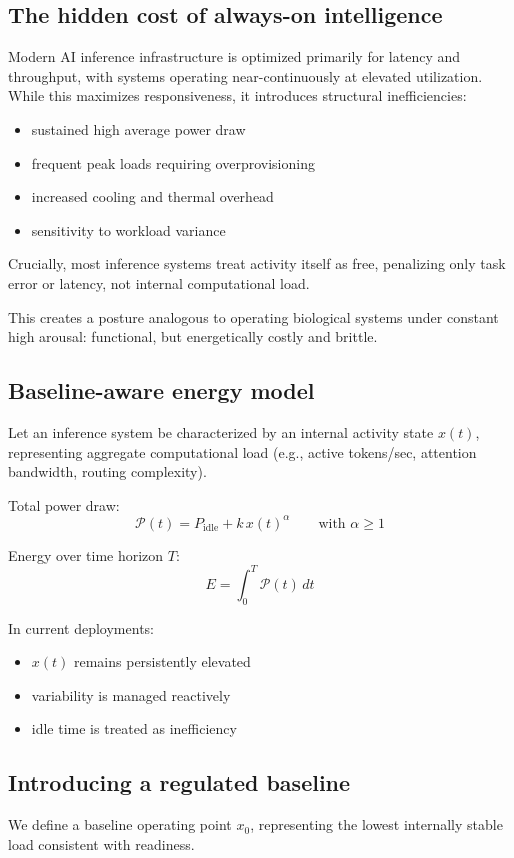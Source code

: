 \documentclass[11pt]{article}
\begin{document}
\subsection{The hidden cost of always-on intelligence}
Modern AI inference infrastructure is optimized primarily for latency and throughput, with systems operating near-continuously at elevated utilization. While this maximizes responsiveness, it introduces structural inefficiencies:

\begin{itemize}
\item sustained high average power draw
\item frequent peak loads requiring overprovisioning
\item increased cooling and thermal overhead
\item sensitivity to workload variance
\end{itemize}

Crucially, most inference systems treat activity itself as free, penalizing only task error or latency, not internal computational load. 

This creates a posture analogous to operating biological systems under constant high arousal: functional, but energetically costly and brittle.

\subsection{Baseline-aware energy model}
Let an inference system be characterized by an internal activity state \(x(t)\), representing aggregate computational load (e.g., active tokens/sec, attention bandwidth, routing complexity).

Total power draw:
\[
\mathcal{P}(t)=P_{\mathrm{idle}} + k\,x(t)^{\alpha}
\qquad \text{with } \alpha \ge 1
\]

Energy over time horizon \(T\):
\[
E=\int_{0}^{T}\mathcal{P}(t)\,dt
\]

In current deployments:

\begin{itemize}
\item \(x(t)\) remains persistently elevated
\item variability is managed reactively
\item idle time is treated as inefficiency
\end{itemize}

\subsection{Introducing a regulated baseline}
We define a baseline operating point \(x_0\), representing the lowest internally stable load consistent with readiness.
\end{document}
